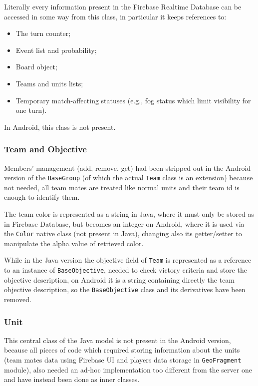 				Literally every information present in the Firebase Realtime Database can be accessed in some way from this class, in particular it keeps references to:
				\begin{itemize}
					\item The turn counter;
					\item Event list and probability;
					\item Board object;
					\item Teams and units lists;
					\item Temporary match-affecting statuses (e.g., fog status which limit visibility for one turn).
				\end{itemize}
			
				In Android, this class is not present.
				
			\subsubsection{Team and Objective}
			
				Members' management (add, remove, get) had been stripped out in the Android version of the \lstinline|BaseGroup| (of which the actual \lstinline|Team| class is an extension) because not needed, all team mates are treated like normal units and their team id is enough to identify them. 
				
				The team color is represented as a string in Java, where it must only be stored as in Firebase Database, but becomes an integer on Android, where it is used via the \lstinline|Color| native class (not present in Java), changing also its getter/setter to manipulate the alpha value of retrieved color.
				
				While in the Java version the objective field of \lstinline|Team| is represented as a reference to an instance of \lstinline|BaseObjective|, needed to check victory criteria and store the objective description, on Android it is a string containing directly the team objective description, so the \lstinline|BaseObjective| class and its derivatives have been removed.
			
			\subsubsection{Unit}
			
				This central class of the Java model is not present in the Android version, because all pieces of code which required storing information about the units (team mates data using Firebase UI and players data storage in \lstinline|GeoFragment| module), also needed an ad-hoc implementation too different from the server one and have instead been done as inner classes.
			
